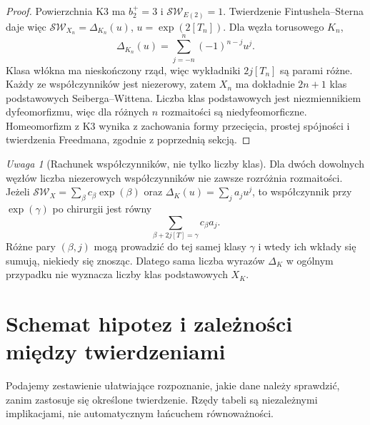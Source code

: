\documentclass[11pt,a4paper]{report}
\numberwithin{equation}{section}
\theoremstyle{plain}
\theoremstyle{definition}
\theoremstyle{remark}
\newtheorem{uwaga}[twierdzenie]{Uwaga}
\begin{document}
\begin{proof}
Powierzchnia K3 ma $b_2^+=3$ i $\mathcal{SW}_{E(2)}=1$.
Twierdzenie Fintushela--Sterna daje więc
$\mathcal{SW}_{X_n}=\Delta_{K_n}(u)$,
$u=\exp(2[T_n])$. Dla węzła torusowego $K_n$,
\[
 \Delta_{K_n}(u)=\sum_{j=-n}^n(-1)^{n-j}u^j.
\]
Klasa włókna ma nieskończony rząd, więc wykładniki
$2j[T_n]$ są parami różne. Każdy ze współczynników
jest niezerowy, zatem $X_n$ ma dokładnie $2n+1$
klas podstawowych Seiberga--Wittena.
Liczba klas podstawowych jest niezmiennikiem dyfeomorfizmu,
więc dla różnych $n$ rozmaitości są niedyfeomorficzne.
Homeomorfizm z K3 wynika z zachowania formy przecięcia,
prostej spójności i twierdzenia Freedmana, zgodnie
z poprzednią sekcją.
\end{proof}

\begin{uwaga}[Rachunek współczynników, nie tylko liczby klas]
Dla dwóch dowolnych węzłów liczba niezerowych współczynników
nie zawsze rozróżnia rozmaitości. Jeżeli
$\mathcal{SW}_X=\sum_\beta c_\beta\exp(\beta)$ oraz
$\Delta_K(u)=\sum_j a_ju^j$, to współczynnik przy
$\exp(\gamma)$ po chirurgii jest równy
\[
 \sum_{\beta+2j[T]=\gamma}c_\beta a_j.
\]
Różne pary $(\beta,j)$ mogą prowadzić do tej samej klasy
$\gamma$ i wtedy ich wkłady się sumują, niekiedy się znosząc.
Dlatego sama liczba wyrazów $\Delta_K$ w ogólnym przypadku
nie wyznacza liczby klas podstawowych $X_K$.
\end{uwaga}

\section{Schemat hipotez i zależności między twierdzeniami}
\label{sec:tg-syn-assumptions}

Podajemy zestawienie ułatwiające rozpoznanie, jakie dane
należy sprawdzić, zanim zastosuje się określone twierdzenie.
Rzędy tabeli są niezależnymi implikacjami, nie automatycznym
łańcuchem równoważności.
\end{document}
